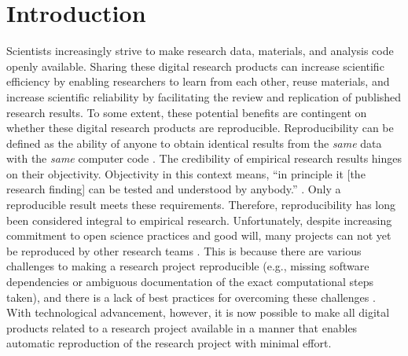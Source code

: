 \documentclass[psych,tutorial,submit,moreauthors,pdftex]{mdpi}
\begin{document}

\captionsetup{labelformat=empty}

\hypertarget{introduction}{%
\section{Introduction}\label{introduction}}

Scientists increasingly strive to make research data, materials, and
analysis code openly available. Sharing these digital research products
can increase scientific efficiency by enabling researchers to learn from
each other, reuse materials, and increase scientific reliability by
facilitating the review and replication of published research results.
To some extent, these potential benefits are contingent on whether these
digital research products are reproducible. Reproducibility can be
defined as the ability of anyone to obtain identical results from the
\emph{same} data with the \emph{same} computer code \citep[see][ for
details]{Peikert2019}. The credibility of empirical research results
hinges on their objectivity. Objectivity in this context means, ``in
principle it {[}the research finding{]} can be tested and understood by
anybody.'' \citep[p.~22]{popperLogicScientificDiscovery2002}. Only a
reproducible result meets these requirements. Therefore, reproducibility
has long been considered integral to empirical research. Unfortunately,
despite increasing commitment to open science practices and good will,
many projects can not yet be reproduced by other research teams
\citep{obels2020}. This is because there are various challenges to
making a research project reproducible (e.g., missing software
dependencies or ambiguous documentation of the exact computational steps
taken), and there is a lack of best practices for overcoming these
challenges \citep[but see][]{vanlissa2020worcs}. With technological
advancement, however, it is now possible to make all digital products
related to a research project available in a manner that enables
automatic reproduction of the research project with minimal effort.
\end{document}
